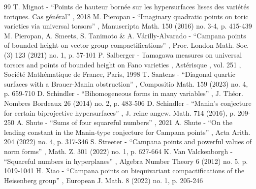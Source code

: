 \documentclass[11pt]{article}
\numberwithin{equation}{section}
\theoremstyle{definition}
\numberwithin{theorem}{section}
\begin{document}
\begin{thebibliography}{99}
 T. Mignot - “Points de hauteur bornée sur les hypersurfaces lisses des variétés toriques. Cas général” , 2018
 M. Pieropan - “Imaginary quadratic points on toric varieties via universal torsors” , Manuscripta Math. 150 (2016) no. 3-4, p. 415-439
 M. Pieropan, A. Smeets, S. Tanimoto \& A. Várilly-Alvarado - “Campana points of bounded height on vector group compactifications” , Proc. London Math. Soc. (3) 123 (2021) no. 1, p. 57-101
 P. Salberger - Tamagawa measures on universal torsors and points of bounded height on Fano varieties , Astérisque , vol. 251 , Société Mathématique de France, Paris, 1998
 T. Santens - “Diagonal quartic surfaces with a Brauer-Manin obstruction” , Compositio Math. 159 (2023) no. 4, p. 659-710
 D. Schindler - “Bihomogeneous forms in many variables” , J. Théor. Nombres Bordeaux 26 (2014) no. 2, p. 483-506
 D. Schindler - “Manin’s conjecture for certain biprojective hypersurfaces” , J. reine angew. Math. 714 (2016), p. 209-250
 A. Shute - “Sums of four squareful numbers” , 2021
 A. Shute - “On the leading constant in the Manin-type conjecture for Campana points” , Acta Arith. 204 (2022) no. 4, p. 317-346
 S. Streeter - “Campana points and powerful values of norm forms” , Math. Z. 301 (2022) no. 1, p. 627-664
 K. Van Valckenborgh - “Squareful numbers in hyperplanes” , Algebra Number Theory 6 (2012) no. 5, p. 1019-1041
 H. Xiao - “Campana points on biequivariant compactifications of the Heisenberg group” , European J. Math. 8 (2022) no. 1, p. 205-246
\end{thebibliography}
\end{document}
